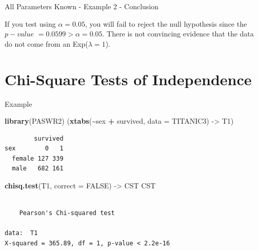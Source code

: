 \documentclass[
  ignorenonframetext,
]{beamer}
\newenvironment{Shaded}{\begin{snugshade}}{\end{snugshade}}
\newcommand{\AttributeTok}[1]{\textcolor[rgb]{0.13,0.29,0.53}{#1}}
\newcommand{\ConstantTok}[1]{\textcolor[rgb]{0.56,0.35,0.01}{#1}}
\newcommand{\FunctionTok}[1]{\textcolor[rgb]{0.13,0.29,0.53}{\textbf{#1}}}
\newcommand{\NormalTok}[1]{#1}
\newcommand{\OtherTok}[1]{\textcolor[rgb]{0.56,0.35,0.01}{#1}}
\newcommand{\SpecialCharTok}[1]{\textcolor[rgb]{0.81,0.36,0.00}{\textbf{#1}}}
\begin{document}
\begin{frame}{All Parameters Known - Example 2 - Conclusion}
\protect\hypertarget{all-parameters-known---example-2---conclusion}{}
\begin{tcolorbox}
If you test using $\alpha = 0.05$, you will fail to reject the null hypothesis since the $p-value$ $= 0.0599 > \alpha = 0.05$.  There is not convincing evidence that the data do not come from an Exp($\lambda = 1$).
\end{tcolorbox}
\end{frame}

\hypertarget{chi-square-tests-of-independence}{%
\section{Chi-Square Tests of
Independence}\label{chi-square-tests-of-independence}}

\begin{frame}[fragile]{Example}
\protect\hypertarget{example}{}
\begin{Shaded}
\begin{Highlighting}[]
\FunctionTok{library}\NormalTok{(PASWR2)}
\NormalTok{(}\FunctionTok{xtabs}\NormalTok{(}\SpecialCharTok{\textasciitilde{}}\NormalTok{sex }\SpecialCharTok{+}\NormalTok{ survived, }\AttributeTok{data =}\NormalTok{ TITANIC3) }\OtherTok{{-}\textgreater{}}\NormalTok{ T1)}
\end{Highlighting}
\end{Shaded}

\begin{verbatim}
        survived
sex        0   1
  female 127 339
  male   682 161
\end{verbatim}

\begin{Shaded}
\begin{Highlighting}[]
\FunctionTok{chisq.test}\NormalTok{(T1, }\AttributeTok{correct =} \ConstantTok{FALSE}\NormalTok{) }\OtherTok{{-}\textgreater{}}\NormalTok{ CST}
\NormalTok{CST}
\end{Highlighting}
\end{Shaded}

\begin{verbatim}

    Pearson's Chi-squared test

data:  T1
X-squared = 365.89, df = 1, p-value < 2.2e-16
\end{verbatim}
\end{frame}
\end{document}
